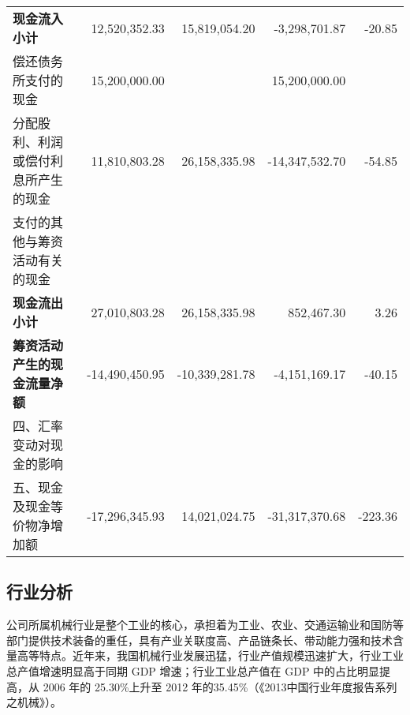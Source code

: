 \begin{longtable}{>{\scriptsize}l>{\scriptsize}r>{\scriptsize}r>{\scriptsize}r>{\scriptsize}r}
\hspace{2em}\bfseries 现金流入小计 & 12,520,352.33 & 15,819,054.20 & -3,298,701.87 & -20.85 \\
\hspace{2em}偿还债务所支付的现金 & 15,200,000.00 &  & 15,200,000.00 & 	 \\
\hspace{2em}分配股利、利润或偿付利息所产生的现金 & 11,810,803.28 & 26,158,335.98 & -14,347,532.70 & -54.85 \\
\hspace{2em}支付的其他与筹资活动有关的现金 &  &  &  &  \\
\hspace{2em}\bfseries 现金流出小计 & 27,010,803.28 & 26,158,335.98 & 852,467.30 & 3.26 \\
\hspace{4em}\bfseries 筹资活动产生的现金流量净额 & -14,490,450.95 & -10,339,281.78 & -4,151,169.17 & -40.15 \\
\midrule
四、汇率变动对现金的影响 &  &  &  & 	 \\
五、现金及现金等价物净增加额 & -17,296,345.93 & 14,021,024.75 & -31,317,370.68 & -223.36 \\
\bottomrule
\end{longtable}\label{cash}

\subsection{行业分析}{}

公司所属机械行业是整个工业的核心，承担着为工业、农业、交通运输业和国防等部门提供技术装备的重任，具有产业关联度高、产品链条长、带动能力强和技术含量高等特点。近年来，我国机械行业发展迅猛，行业产值规模迅速扩大，行业工业总产值增速明显高于同期 GDP 增速；行业工业总产值在 GDP 中的占比明显提高，从 2006 年的 25.30\%上升至 2012 年的35.45\%（《2013中国行业年度报告系列之机械》）。

